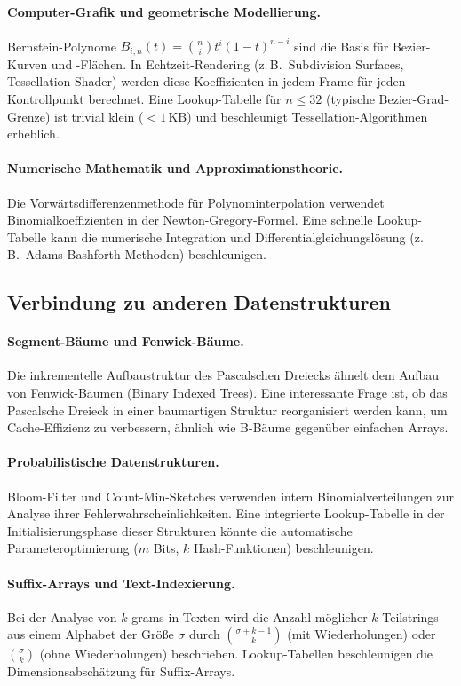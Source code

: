 ﻿\documentclass[12pt, a4paper]{article}
\theoremstyle{plain}
\theoremstyle{definition}
\theoremstyle{remark}
\begin{document}
\paragraph{Computer-Grafik und geometrische Modellierung.}
Bernstein-Polynome $B_{i,n}(t) = \binom{n}{i} t^i (1-t)^{n-i}$
sind die Basis für Bezier-Kurven und -Flächen. In Echtzeit-Rendering
(z.\,B.\ Subdivision Surfaces, Tessellation Shader) werden diese
Koeffizienten in jedem Frame für jeden Kontrollpunkt berechnet.
Eine Lookup-Tabelle für $n \le 32$ (typische Bezier-Grad-Grenze)
ist trivial klein ($< 1\,\text{KB}$) und beschleunigt
Tessellation-Algorithmen erheblich.

\paragraph{Numerische Mathematik und Approximationstheorie.}
Die Vorwärtsdifferenzenmethode für Polynominterpolation verwendet
Binomialkoeffizienten in der Newton-Gregory-Formel. Eine schnelle
Lookup-Tabelle kann die numerische Integration und
Differentialgleichungslösung (z.\,B.\ Adams-Bashforth-Methoden)
beschleunigen.

\subsection{Verbindung zu anderen Datenstrukturen}

\paragraph{Segment-Bäume und Fenwick-Bäume.}
Die inkrementelle Aufbaustruktur des Pascalschen Dreiecks ähnelt
dem Aufbau von Fenwick-Bäumen (Binary Indexed Trees). Eine
interessante Frage ist, ob das Pascalsche Dreieck in einer
baumartigen Struktur reorganisiert werden kann, um Cache-Effizienz
zu verbessern, ähnlich wie B-Bäume gegenüber einfachen Arrays.

\paragraph{Probabilistische Datenstrukturen.}
Bloom-Filter und Count-Min-Sketches verwenden intern Binomialverteilungen
zur Analyse ihrer Fehlerwahrscheinlichkeiten. Eine integrierte
Lookup-Tabelle in der Initialisierungsphase dieser Strukturen könnte
die automatische Parameteroptimierung ($m$ Bits, $k$ Hash-Funktionen)
beschleunigen.

\paragraph{Suffix-Arrays und Text-Indexierung.}
Bei der Analyse von $k$-grams in Texten wird die Anzahl möglicher
$k$-Teilstrings aus einem Alphabet der Größe $\sigma$ durch
$\binom{\sigma + k - 1}{k}$ (mit Wiederholungen) oder $\binom{\sigma}{k}$
(ohne Wiederholungen) beschrieben. Lookup-Tabellen beschleunigen
die Dimensionsabschätzung für Suffix-Arrays.
\end{document}
